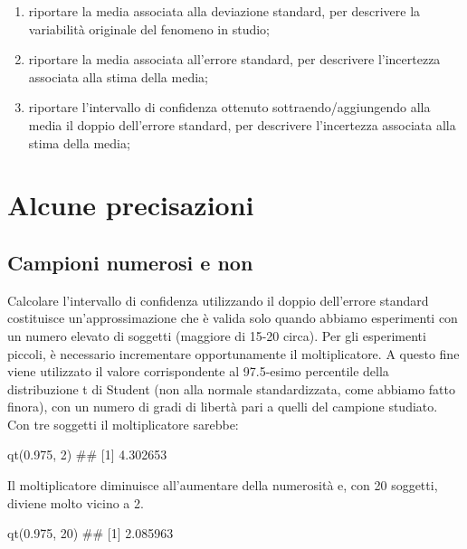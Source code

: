 \documentclass[a4paper,12pt,oneside]{book}
\providecommand{\tightlist}{%
  \setlength{\itemsep}{0pt}\setlength{\parskip}{0pt}}
\newenvironment{Shaded}{}{}
\newcommand{\KeywordTok}[1]{#1}
\newcommand{\DecValTok}[1]{#1}
\newcommand{\FloatTok}[1]{#1}
\newcommand{\CommentTok}[1]{#1}
\newcommand{\NormalTok}[1]{#1}
\begin{document}
\begin{enumerate}
\def\labelenumi{\arabic{enumi}.}
\tightlist
\item
  riportare la media associata alla deviazione standard, per descrivere la variabilità originale del fenomeno in studio;
\item
  riportare la media associata all'errore standard, per descrivere l'incertezza associata alla stima della media;
\item
  riportare l'intervallo di confidenza ottenuto sottraendo/aggiungendo alla media il doppio dell'errore standard, per descrivere l'incertezza associata alla stima della media;
\end{enumerate}

\hypertarget{alcune-precisazioni}{%
\section{Alcune precisazioni}\label{alcune-precisazioni}}

\hypertarget{campioni-numerosi-e-non}{%
\subsection{Campioni numerosi e non}\label{campioni-numerosi-e-non}}

Calcolare l'intervallo di confidenza utilizzando il doppio dell'errore standard costituisce un'approssimazione che è valida solo quando abbiamo esperimenti con un numero elevato di soggetti (maggiore di 15-20 circa). Per gli esperimenti piccoli, è necessario incrementare opportunamente il moltiplicatore. A questo fine viene utilizzato il valore corrispondente al 97.5-esimo percentile della distribuzione t di Student (non alla normale standardizzata, come abbiamo fatto finora), con un numero di gradi di libertà pari a quelli del campione studiato. Con tre soggetti il moltiplicatore sarebbe:

\begin{Shaded}
\begin{Highlighting}[]
\KeywordTok{qt}\NormalTok{(}\FloatTok{0.975}\NormalTok{, }\DecValTok{2}\NormalTok{)}
\CommentTok{## [1] 4.302653}
\end{Highlighting}
\end{Shaded}

Il moltiplicatore diminuisce all'aumentare della numerosità e, con 20 soggetti, diviene molto vicino a 2.

\begin{Shaded}
\begin{Highlighting}[]
\KeywordTok{qt}\NormalTok{(}\FloatTok{0.975}\NormalTok{, }\DecValTok{20}\NormalTok{)}
\CommentTok{## [1] 2.085963}
\end{Highlighting}
\end{Shaded}
\end{document}
